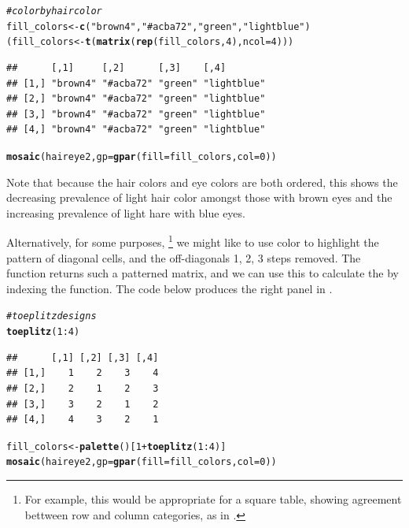 \documentclass[11pt]{book}\usepackage[]{graphicx}\usepackage[]{color}
\makeatletter
\newcommand{\hlnum}[1]{\textcolor[rgb]{0.686,0.059,0.569}{#1}}%
\newcommand{\hlstr}[1]{\textcolor[rgb]{0.192,0.494,0.8}{#1}}%
\newcommand{\hlcom}[1]{\textcolor[rgb]{0.678,0.584,0.686}{\textit{#1}}}%
\newcommand{\hlopt}[1]{\textcolor[rgb]{0,0,0}{#1}}%
\newcommand{\hlstd}[1]{\textcolor[rgb]{0.345,0.345,0.345}{#1}}%
\newcommand{\hlkwb}[1]{\textcolor[rgb]{0.69,0.353,0.396}{#1}}%
\newcommand{\hlkwc}[1]{\textcolor[rgb]{0.333,0.667,0.333}{#1}}%
\newcommand{\hlkwd}[1]{\textcolor[rgb]{0.737,0.353,0.396}{\textbf{#1}}}%
\newenvironment{kframe}{%
 \def\at@end@of@kframe{}%
 \ifinner\ifhmode%
  \def\at@end@of@kframe{\end{minipage}}%
  \begin{minipage}{\columnwidth}%
 \fi\fi%
 \def\FrameCommand##1{\hskip\@totalleftmargin \hskip-\fboxsep
 \colorbox{shadecolor}{##1}\hskip-\fboxsep
     \hskip-\linewidth \hskip-\@totalleftmargin \hskip\columnwidth}%
 \MakeFramed {\advance\hsize-\width
   \@totalleftmargin\z@ \linewidth\hsize
   \@setminipage}}%
 {\par\unskip\endMakeFramed%
 \at@end@of@kframe}
\newenvironment{knitrout}{}{} %
\renewenvironment{knitrout}{\small\renewcommand{\baselinestretch}{.85}}{} %
\makeatother
\begin{document}
\begin{knitrout}
\color{fgcolor}\begin{kframe}
\begin{alltt}
\hlcom{# color by hair color}
\hlstd{fill_colors} \hlkwb{<-} \hlkwd{c}\hlstd{(}\hlstr{"brown4"}\hlstd{,} \hlstr{"#acba72"}\hlstd{,} \hlstr{"green"}\hlstd{,} \hlstr{"lightblue"}\hlstd{)}
\hlstd{(fill_colors} \hlkwb{<-} \hlkwd{t}\hlstd{(}\hlkwd{matrix}\hlstd{(}\hlkwd{rep}\hlstd{(fill_colors,} \hlnum{4}\hlstd{),} \hlkwc{ncol}\hlstd{=}\hlnum{4}\hlstd{)))}
\end{alltt}
\begin{verbatim}
##      [,1]     [,2]      [,3]    [,4]       
## [1,] "brown4" "#acba72" "green" "lightblue"
## [2,] "brown4" "#acba72" "green" "lightblue"
## [3,] "brown4" "#acba72" "green" "lightblue"
## [4,] "brown4" "#acba72" "green" "lightblue"
\end{verbatim}
\begin{alltt}
\hlkwd{mosaic}\hlstd{(haireye2,} \hlkwc{gp}\hlstd{=}\hlkwd{gpar}\hlstd{(}\hlkwc{fill}\hlstd{=fill_colors,} \hlkwc{col}\hlstd{=}\hlnum{0}\hlstd{))}
\end{alltt}
\end{kframe}
\end{knitrout}

\noindent Note that because the hair colors and eye colors are both ordered,
this shows the decreasing prevalence of light hair color amongst those with brown eyes
and the increasing prevalence of light hare with blue eyes.

Alternatively, for some purposes,%
\footnote{
For example, this would be appropriate for a square table, showing agreement bettween
row and column categories, as in .
}
we might like to use color to highlight the pattern
of diagonal cells, and the off-diagonals 1, 2, 3 steps removed.
The \R function  returns such a patterned matrix, and we can use this
to calculate the  by indexing the  function.  The code below produces the right panel in 
.
\begin{knitrout}
\color{fgcolor}\begin{kframe}
\begin{alltt}
\hlcom{# toeplitz designs}
\hlkwd{toeplitz}\hlstd{(}\hlnum{1}\hlopt{:}\hlnum{4}\hlstd{)}
\end{alltt}
\begin{verbatim}
##      [,1] [,2] [,3] [,4]
## [1,]    1    2    3    4
## [2,]    2    1    2    3
## [3,]    3    2    1    2
## [4,]    4    3    2    1
\end{verbatim}
\begin{alltt}
\hlstd{fill_colors} \hlkwb{<-} \hlkwd{palette}\hlstd{()[}\hlnum{1}\hlopt{+}\hlkwd{toeplitz}\hlstd{(}\hlnum{1}\hlopt{:}\hlnum{4}\hlstd{)]}
\hlkwd{mosaic}\hlstd{(haireye2,} \hlkwc{gp}\hlstd{=}\hlkwd{gpar}\hlstd{(}\hlkwc{fill}\hlstd{=fill_colors,} \hlkwc{col}\hlstd{=}\hlnum{0}\hlstd{))}
\end{alltt}
\end{kframe}
\end{knitrout}
\end{document}
